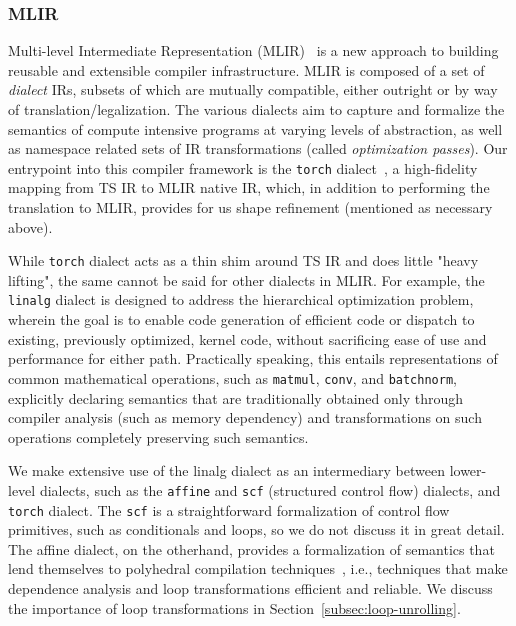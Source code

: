 \subsubsection{MLIR}\label{subsec:mlir}

Multi-level Intermediate Representation (MLIR)~\cite{https://doi.org/10.48550/arxiv.2002.11054} is a new approach to building reusable and extensible compiler infrastructure.
MLIR is composed of a set of \emph{dialect} IRs, subsets of which are mutually compatible, either outright or by way of translation/legalization.
The various dialects aim to capture and formalize the semantics of compute intensive programs at varying levels of abstraction, as well as namespace related sets of IR transformations (called \emph{optimization passes}).
Our entrypoint into this compiler framework is the \texttt{torch} dialect~\cite{torch-mlir}, a high-fidelity mapping from TS IR to MLIR native IR, which, in addition to performing the translation to MLIR, provides for us shape refinement (mentioned as necessary above).

While \texttt{torch} dialect acts as a thin shim around TS IR and does little "heavy lifting", the same cannot be said for other dialects in MLIR.
For example, the \texttt{linalg} dialect is designed to address the hierarchical optimization problem, wherein the goal is to enable code generation of efficient code or dispatch to existing, previously optimized, kernel code, without sacrificing ease of use and performance for either path.
Practically speaking, this entails representations of common mathematical operations, such as \texttt{matmul}, \texttt{conv}, and \texttt{batchnorm}, explicitly declaring semantics that are traditionally obtained only through compiler analysis (such as memory dependency) and transformations on such operations completely preserving such semantics.

We make extensive use of the linalg dialect as an intermediary between lower-level dialects, such as the \texttt{affine} and \texttt{scf} (structured control flow) dialects, and \texttt{torch} dialect.
The \texttt{scf} is a straightforward formalization of control flow primitives, such as conditionals and loops, so we do not discuss it in great detail.
The affine dialect, on the otherhand, provides a formalization of semantics that lend themselves to polyhedral compilation techniques~\cite{polyhedral-mlir}, i.e., techniques that make dependence analysis and loop transformations efficient and reliable.
We discuss the importance of loop transformations in Section~\ref{subsec:loop-unrolling}.

